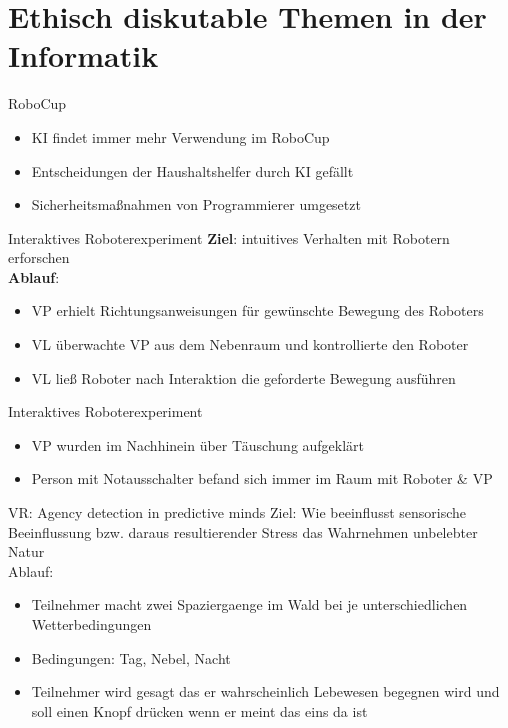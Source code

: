 \documentclass[10pt]{beamer}
\begin{document}
\section{Ethisch diskutable Themen in der Informatik}
	
	\begin{frame}{RoboCup}
		\begin{itemize}
			\item KI findet immer mehr Verwendung im RoboCup
			\item Entscheidungen der Haushaltshelfer durch KI gefällt
			\item Sicherheitsmaßnahmen von Programmierer umgesetzt
		\end{itemize}
	\end{frame}
	
	\begin{frame}{Interaktives Roboterexperiment}
		\textbf{Ziel}: intuitives Verhalten mit Robotern erforschen\\
		\vspace{0.8cm}
		\textbf{Ablauf}:
		\begin{itemize}
			\item VP erhielt Richtungsanweisungen für gewünschte Bewegung des Roboters
			\item VL überwachte VP aus dem Nebenraum und kontrollierte den Roboter
			\item VL ließ Roboter nach Interaktion die geforderte Bewegung ausführen
		\end{itemize}
	\end{frame}
	
	\begin{frame}{Interaktives Roboterexperiment}

		\begin{itemize}
			\item VP wurden im Nachhinein über Täuschung aufgeklärt
			\item Person mit Notausschalter befand sich immer im Raum mit Roboter \& VP
		\end{itemize}
	\end{frame}
	
	\begin{frame}{VR: Agency detection in predictive minds}
		Ziel: Wie beeinflusst sensorische Beeinflussung bzw. daraus resultierender Stress das Wahrnehmen unbelebter Natur \\
		Ablauf:
		\begin{itemize}
		\item Teilnehmer macht zwei Spaziergaenge im Wald bei je unterschiedlichen Wetterbedingungen
		\item Bedingungen: Tag, Nebel, Nacht
		\item Teilnehmer wird gesagt das er wahrscheinlich Lebewesen begegnen wird und soll einen Knopf drücken wenn er meint das eins da ist
		\end{itemize}
	\end{frame}
	
\end{document}
